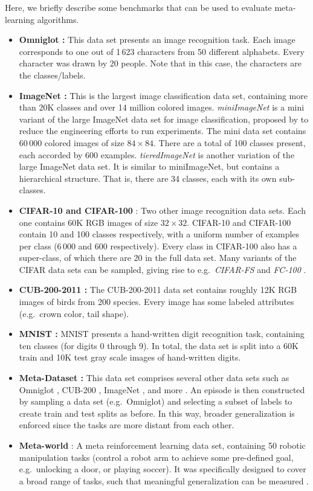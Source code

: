 \label{sec:benchmarks}
Here, we briefly describe some benchmarks that can be used to evaluate meta-learning algorithms. 
\begin{itemize}
    \item \textbf{Omniglot :} This data set presents an image recognition task. Each image corresponds to one out of 1\,623 characters from 50 different alphabets. Every character was drawn by 20 people. Note that in this case, the characters are the classes/labels. \item \textbf{ImageNet :} This is the largest image classification data set, containing more than 20K classes and over 14 million colored images. \textit{miniImageNet} is a mini variant of the large ImageNet data set  for image classification, proposed by  to reduce the engineering efforts to run experiments. The mini data set contains 60\,000 colored images of size $84 \times 84$. There are a total of 100 classes present, each accorded by 600 examples. \textit{tieredImageNet}  is another variation of the large ImageNet data set. It is similar to miniImageNet, but contains a hierarchical structure. That is, there are 34 classes, each with its own sub-classes. 
    \item \textbf{CIFAR-10 and CIFAR-100 }: Two other image recognition data sets. Each one contains 60K RGB images of size $32 \times 32$. CIFAR-10 and CIFAR-100 contain 10 and 100 classes respectively, with a uniform number of examples per class (6\,000 and 600 respectively). Every class in CIFAR-100 also has a super-class, of which there are 20 in the full data set. Many variants of the CIFAR data sets can be sampled, giving rise to e.g.\ \textit{CIFAR-FS}  and \textit{FC-100} .
    \item \textbf{CUB-200-2011 :} The CUB-200-2011 data set contains roughly 12K RGB images of birds from 200 species. Every image has some labeled attributes (e.g.\ crown color, tail shape).
    \item \textbf{MNIST :} MNIST presents a hand-written digit recognition task, containing ten classes (for digits 0 through 9). In total, the data set is split into a 60K train and 10K test gray scale images of hand-written digits.    
    \item \textbf{Meta-Dataset :} This data set comprises several other data sets such as Omniglot , CUB-200 , ImageNet , and more . An episode is then constructed by sampling a data set (e.g.\ Omniglot) and selecting a subset of labels to create train and test splits as before. In this way, broader generalization is enforced since the tasks are more distant from each other.  
    \item \textbf{Meta-world }: A meta reinforcement learning data set, containing 50 robotic manipulation tasks (control a robot arm to achieve some pre-defined goal, e.g.\ unlocking a door, or playing soccer). It was specifically designed to cover a broad range of tasks, such that meaningful generalization can be measured .
\end{itemize}
